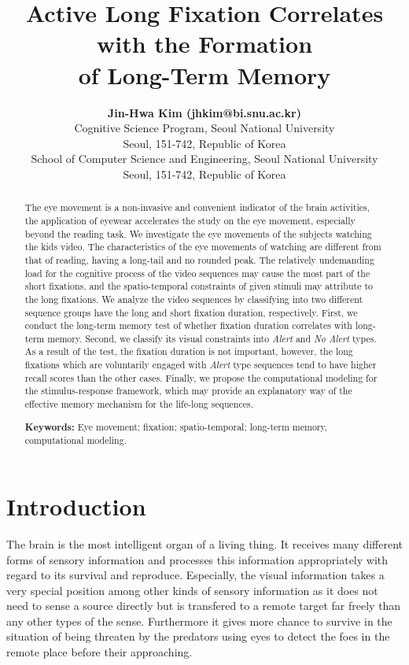 \documentclass[10pt,letterpaper]{article}
\title{Active Long Fixation Correlates with the Formation \\
of Long-Term Memory}
\author{{\large \bf Jin-Hwa Kim (jhkim@bi.snu.ac.kr)} \\
  Cognitive Science Program, Seoul National University \\
  Seoul, 151-742, Republic of Korea
  \AND {\large \bf Byoung-Tak Zhang (btzhang@bi.snu.ac.kr)} \\
  School of Computer Science and Engineering, Seoul National University \\
  Seoul, 151-742, Republic of Korea}
\begin{document}
\maketitle

\begin{abstract}
The eye movement is a non-invasive and convenient indicator of the brain activities, the application of eyewear accelerates the study on the eye movement, especially beyond the reading task. We investigate the eye movements of the subjects watching the kids video. The characteristics of the eye movements of watching are different from that of reading, having a long-tail and no rounded peak. The relatively undemanding load for the cognitive process of the video sequences may cause the most part of the short fixations, and the spatio-temporal constraints of given stimuli may attribute to the long fixations. We analyze the video sequences by classifying into two different sequence groups have the long and short fixation duration, respectively. First, we conduct the long-term memory test of whether fixation duration correlates with long-term memory. Second, we classify its visual constraints into \textit{Alert} and \textit{No Alert} types. As a result of the test, the fixation duration is not important, however, the long fixations which are voluntarily engaged with \textit{Alert} type sequences tend to have higher recall scores than the other cases. Finally, we propose the computational modeling for the stimulus-response framework, which may provide an explanatory way of the effective memory mechanism for the life-long sequences.

\textbf{Keywords:} 
Eye movement; fixation; spatio-temporal; long-term memory, computational modeling.
\end{abstract}


\section{Introduction}

The brain is the most intelligent organ of a living thing. It receives many different forms of sensory information and processes this information appropriately with regard to its survival and reproduce. Especially, the visual information takes a very special position among other kinds of sensory information as it does not need to sense a source directly but is transfered to a remote target far freely than any other types of the sense. Furthermore it gives more chance to survive in the situation of being threaten by the predators using eyes to detect the foes in the remote place before their approaching. 
\end{document}
